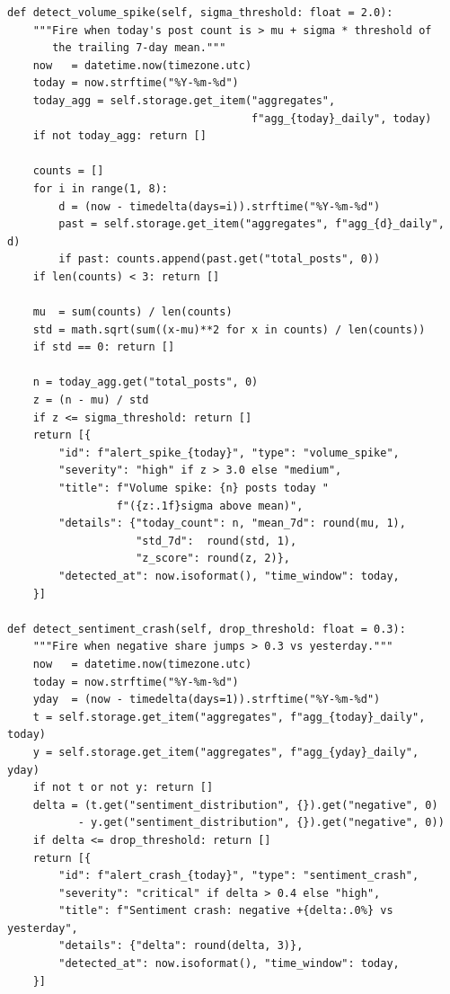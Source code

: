 \begin{lstlisting}[caption={Volume-spike and sentiment-crash detectors ({\tt src/alerts/engine.py}).},label={lst:alerts}]
def detect_volume_spike(self, sigma_threshold: float = 2.0):
    """Fire when today's post count is > mu + sigma * threshold of
       the trailing 7-day mean."""
    now   = datetime.now(timezone.utc)
    today = now.strftime("%Y-%m-%d")
    today_agg = self.storage.get_item("aggregates",
                                      f"agg_{today}_daily", today)
    if not today_agg: return []

    counts = []
    for i in range(1, 8):
        d = (now - timedelta(days=i)).strftime("%Y-%m-%d")
        past = self.storage.get_item("aggregates", f"agg_{d}_daily", d)
        if past: counts.append(past.get("total_posts", 0))
    if len(counts) < 3: return []

    mu  = sum(counts) / len(counts)
    std = math.sqrt(sum((x-mu)**2 for x in counts) / len(counts))
    if std == 0: return []

    n = today_agg.get("total_posts", 0)
    z = (n - mu) / std
    if z <= sigma_threshold: return []
    return [{
        "id": f"alert_spike_{today}", "type": "volume_spike",
        "severity": "high" if z > 3.0 else "medium",
        "title": f"Volume spike: {n} posts today "
                 f"({z:.1f}sigma above mean)",
        "details": {"today_count": n, "mean_7d": round(mu, 1),
                    "std_7d":  round(std, 1),
                    "z_score": round(z, 2)},
        "detected_at": now.isoformat(), "time_window": today,
    }]

def detect_sentiment_crash(self, drop_threshold: float = 0.3):
    """Fire when negative share jumps > 0.3 vs yesterday."""
    now   = datetime.now(timezone.utc)
    today = now.strftime("%Y-%m-%d")
    yday  = (now - timedelta(days=1)).strftime("%Y-%m-%d")
    t = self.storage.get_item("aggregates", f"agg_{today}_daily", today)
    y = self.storage.get_item("aggregates", f"agg_{yday}_daily",  yday)
    if not t or not y: return []
    delta = (t.get("sentiment_distribution", {}).get("negative", 0)
           - y.get("sentiment_distribution", {}).get("negative", 0))
    if delta <= drop_threshold: return []
    return [{
        "id": f"alert_crash_{today}", "type": "sentiment_crash",
        "severity": "critical" if delta > 0.4 else "high",
        "title": f"Sentiment crash: negative +{delta:.0%} vs yesterday",
        "details": {"delta": round(delta, 3)},
        "detected_at": now.isoformat(), "time_window": today,
    }]
\end{lstlisting}

